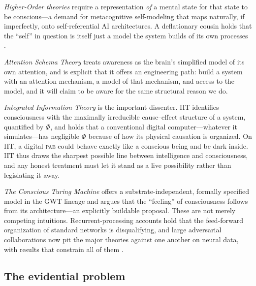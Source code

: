 \documentclass[11pt,a4paper]{article}
\theoremstyle{definition}
\newcommand{\pae}{\textsc{pae}\xspace}
\begin{document}
\emph{Higher-Order theories} \citep{rosenthal2005} require a representation \emph{of} a mental state for that state to be conscious---a demand for metacognitive self-modeling that maps naturally, if imperfectly, onto self-referential AI architectures. A deflationary cousin holds that the ``self'' in question is itself just a model the system builds of its own processes \citep{metzinger2003}.

\emph{Attention Schema Theory} \citep{webb2015} treats awareness as the brain's simplified model of its own attention, and is explicit that it offers an engineering path: build a system with an attention mechanism, a model of that mechanism, and access to the model, and it will claim to be aware for the same structural reason we do.

\emph{Integrated Information Theory} \citep{tononi2004,oizumi2014iit3,albantakis2023iit4} is the important dissenter. IIT identifies consciousness with the maximally irreducible cause--effect structure of a system, quantified by $\Phi$, and holds that a conventional digital computer---whatever it simulates---has negligible $\Phi$ because of how its physical causation is organized. On IIT, a digital \pae{} could behave exactly like a conscious being and be dark inside. IIT thus draws the sharpest possible line between intelligence and consciousness, and any honest treatment must let it stand as a live possibility rather than legislating it away.

\emph{The Conscious Turing Machine} \citep{blumblum2022ctm} offers a substrate-independent, formally specified model in the GWT lineage and argues that the ``feeling'' of consciousness follows from its architecture---an explicitly buildable proposal. These are not merely competing intuitions. Recurrent-processing accounts \citep{lamme2006} hold that the feed-forward organization of standard networks is disqualifying, and large adversarial collaborations now pit the major theories against one another on neural data, with results that constrain all of them \citep{cogitate2025}.

\subsection{The evidential problem}
\end{document}

